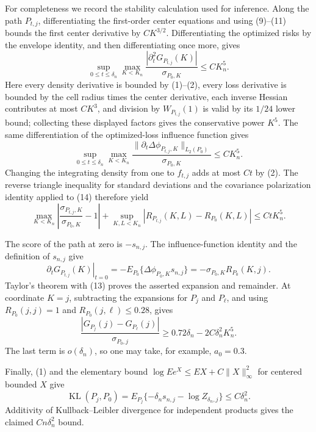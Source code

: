 For completeness we record the stability calculation used for inference.  Along the path \(P_{t,j}\), differentiating the first-order center equations and using (9)--(11) bounds the first center derivative by \(CK^{3/2}\).  Differentiating the optimized risks by the envelope identity, and then differentiating once more, gives
\[
 \sup_{0\leq t\leq\delta_n}\max_{K<K_n}
 \frac{|\partial_t^2G_{P_{t,j}}(K)|}{\sigma_{P_0,K}}
 \leq CK_n^5. \tag{13}
\]
Here every density derivative is bounded by (1)--(2), every loss derivative is bounded by the cell radius times the center derivative, each inverse Hessian contributes at most \(CK^3\), and division by \(W_{P_{t,j}}(1)\) is valid by its \(1/24\) lower bound; collecting these displayed factors gives the conservative power \(K^5\).  The same differentiation of the optimized-loss influence function gives
\[
 \sup_{0\leq t\leq\delta_n}\max_{K<K_n}
 \frac{\|\partial_t\Delta\phi_{P_{t,j},K}\|_{L_2(P_0)}}{\sigma_{P_0,K}}
 \leq CK_n^5. \tag{14}
\]
Changing the integrating density from one to \(f_{t,j}\) adds at most \(Ct\) by (2).  The reverse triangle inequality for standard deviations and the covariance polarization identity applied to (14) therefore yield
\[
 \max_{K<K_n}\left|\frac{\sigma_{P_{t,j},K}}{\sigma_{P_0,K}}-1\right|
 +\sup_{K,L<K_n}|R_{P_{t,j}}(K,L)-R_{P_0}(K,L)|
 \leq CtK_n^5. \tag{15}
\]

The score of the path at zero is \(-s_{n,j}\).  The influence-function identity and the definition of \(s_{n,j}\) give
\[
 \left.\partial_tG_{P_{t,j}}(K)\right|_{t=0}
 =-E_{P_0}\{\Delta\phi_{P_0,K}s_{n,j}\}
 =-\sigma_{P_0,K}R_{P_0}(K,j). \tag{16}
\]
Taylor's theorem with (13) proves the asserted expansion and remainder.  At coordinate \(K=j\), subtracting the expansions for \(P_j\) and \(P_\ell\), and using \(R_{P_0}(j,j)=1\) and \(R_{P_0}(j,\ell)\leq0.28\), gives
\[
 \frac{|G_{P_j}(j)-G_{P_\ell}(j)|}{\sigma_{P_0,j}}
 \geq0.72\delta_n-2C\delta_n^2K_n^5.
\]
The last term is \(o(\delta_n)\), so one may take, for example, \(a_0=0.3\).

Finally, (1) and the elementary bound \(\log E e^{X}\leq E X+C\|X\|_\infty^2\) for centered bounded \(X\) give
\[
 \operatorname{KL}(P_j,P_0)
 =E_{P_j}\{-\delta_ns_{n,j}-\log Z_{\delta_n,j}\}
 \leq C\delta_n^2.
\]
Additivity of Kullback--Leibler divergence for independent products gives the claimed \(Cn\delta_n^2\) bound.